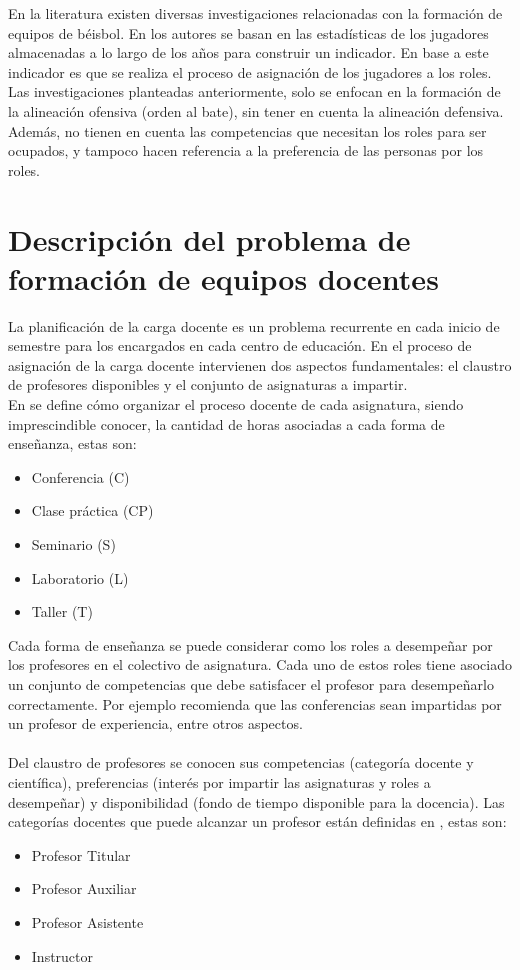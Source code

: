En la literatura existen diversas investigaciones relacionadas con la formación de equipos de béisbol. En \cite{Polyashuk2015, Sugrue2007} los autores se basan en las estadísticas de los jugadores almacenadas a lo largo de los años para construir un indicador. En base a este indicador es que se realiza el proceso de asignación de los jugadores a los roles. Las investigaciones planteadas anteriormente, solo se enfocan en la formación de la alineación ofensiva (orden al bate), sin tener en cuenta la alineación defensiva. Además, no tienen en cuenta las competencias que necesitan los roles para ser ocupados, y tampoco hacen referencia a la preferencia de las personas por los roles.

\section{Descripción del problema de formación de equipos docentes} \label{ej-carga}

La planificación de la carga docente es un problema recurrente en cada inicio de semestre para los encargados en cada centro de educación. En el proceso de asignación de la carga docente intervienen dos aspectos fundamentales: el claustro de profesores disponibles y el conjunto de asignaturas a impartir.\\

En \cite{res2018} se define cómo organizar el proceso docente de cada asignatura, siendo imprescindible conocer, la cantidad de horas asociadas a cada forma de enseñanza, estas son:
\begin{itemize}
	\item Conferencia (C)
	\item Clase práctica (CP)
	\item Seminario (S)
	\item Laboratorio (L)
	\item Taller  (T)
\end{itemize}

Cada forma de enseñanza se puede considerar como los roles a desempeñar por los profesores en el colectivo de asignatura. Cada uno de estos roles tiene asociado un conjunto de competencias que debe satisfacer el profesor para desempeñarlo correctamente. Por ejemplo \cite{res2016} recomienda que las conferencias sean impartidas por un profesor de experiencia, entre otros aspectos.\\\\
{\color{red}
Del claustro de profesores se conocen sus competencias (categoría docente y científica), preferencias (interés por impartir las asignaturas y roles a desempeñar) y disponibilidad (fondo de tiempo disponible para la docencia). Las categorías docentes que puede alcanzar un profesor están definidas en \cite{res2016}, estas son:
}
\begin{itemize}
	\item Profesor Titular
	\item Profesor Auxiliar
	\item Profesor Asistente
	\item Instructor
\end{itemize} 

